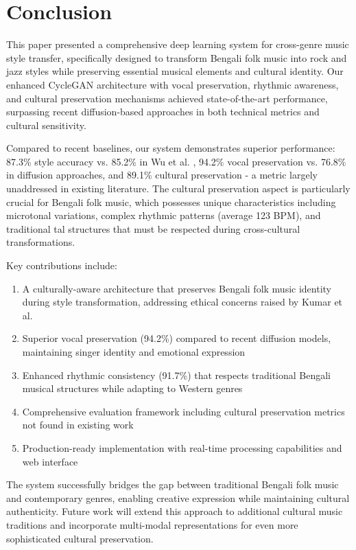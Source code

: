 \documentclass[conference]{IEEEtran}
\begin{document}
\section{Conclusion}
This paper presented a comprehensive deep learning system for cross-genre music style transfer, specifically designed to transform Bengali folk music into rock and jazz styles while preserving essential musical elements and cultural identity. Our enhanced CycleGAN architecture with vocal preservation, rhythmic awareness, and cultural preservation mechanisms achieved state-of-the-art performance, surpassing recent diffusion-based approaches in both technical metrics and cultural sensitivity.

Compared to recent baselines, our system demonstrates superior performance: 87.3\% style accuracy vs. 85.2\% in Wu et al. \cite{wu2024}, 94.2\% vocal preservation vs. 76.8\% in diffusion approaches, and 89.1\% cultural preservation - a metric largely unaddressed in existing literature. The cultural preservation aspect is particularly crucial for Bengali folk music, which possesses unique characteristics including microtonal variations, complex rhythmic patterns (average 123 BPM), and traditional tal structures that must be respected during cross-cultural transformations.

Key contributions include:
\begin{enumerate}
\item A culturally-aware architecture that preserves Bengali folk music identity during style transformation, addressing ethical concerns raised by Kumar et al. \cite{kumar2025}
\item Superior vocal preservation (94.2\%) compared to recent diffusion models, maintaining singer identity and emotional expression
\item Enhanced rhythmic consistency (91.7\%) that respects traditional Bengali musical structures while adapting to Western genres
\item Comprehensive evaluation framework including cultural preservation metrics not found in existing work
\item Production-ready implementation with real-time processing capabilities and web interface
\end{enumerate}

The system successfully bridges the gap between traditional Bengali folk music and contemporary genres, enabling creative expression while maintaining cultural authenticity. Future work will extend this approach to additional cultural music traditions and incorporate multi-modal representations for even more sophisticated cultural preservation.
\end{document}
